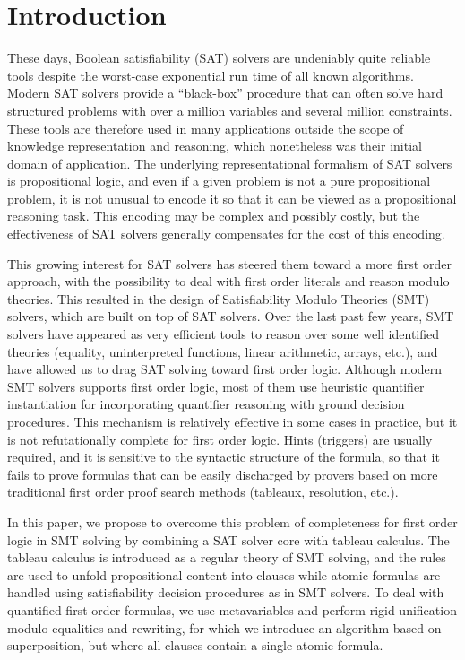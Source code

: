 
\section{Introduction}

These days, Boolean satisfiability (SAT) solvers are undeniably quite reliable
tools despite the worst-case exponential run time of all known
algorithms. Modern SAT solvers provide a ``black-box'' procedure that can often
solve hard structured problems with over a million variables and several million
constraints. These tools are therefore used in many applications outside the
scope of knowledge representation and reasoning, which nonetheless was their
initial domain of application. The underlying representational formalism of SAT
solvers is propositional logic, and even if a given problem is not a pure
propositional problem, it is not unusual to encode it so that it can be viewed
as a propositional reasoning task. This encoding may be complex and possibly
costly, but the effectiveness of SAT solvers generally compensates for the cost
of this encoding.

This growing interest for SAT solvers has steered them toward a more first order
approach, with the possibility to deal with first order literals and reason
modulo theories. This resulted in the design of Satisfiability Modulo Theories
(SMT) solvers, which are built on top of SAT solvers. Over the last past few
years, SMT solvers have appeared as very efficient tools to reason over some
well identified theories (equality, uninterpreted functions, linear arithmetic,
arrays, etc.), and have allowed us to drag SAT solving toward first order logic.
Although modern SMT solvers supports first order logic, most of them use
heuristic quantifier instantiation for incorporating quantifier reasoning with
ground decision procedures. This mechanism is relatively effective in some cases
in practice, but it is not refutationally complete for first order logic. Hints
(triggers) are usually required, and it is sensitive to the syntactic structure
of the formula, so that it fails to prove formulas that can be easily discharged
by provers based on more traditional first order proof search methods (tableaux,
resolution, etc.).

In this paper, we propose to overcome this problem of completeness for first
order logic in SMT solving by combining a SAT solver core with tableau
calculus. The tableau calculus is introduced as a regular theory of SMT solving,
and the rules are used to unfold propositional content into clauses while atomic
formulas are handled using satisfiability decision procedures as in
SMT solvers. To deal with quantified first order formulas, we use
metavariables and perform rigid unification modulo equalities and rewriting, for
which we introduce an algorithm based on superposition, but where all clauses
contain a single atomic formula.


